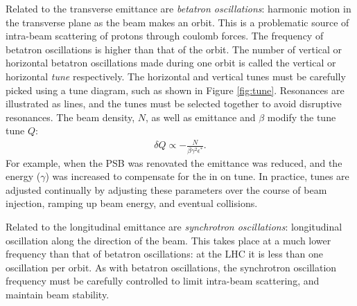 Related to the transverse emittance are \emph{betatron oscillations}: harmonic motion in the transverse plane as the beam makes an orbit.\cite{pdgAccelSection}
This is a problematic source of intra-beam scattering of protons through coulomb forces.
The frequency of betatron oscillations is higher than that of the orbit.
The number of vertical or horizontal betatron oscillations made during one orbit is called the vertical or horizontal \emph{tune} respectively.
The horizontal and vertical tunes must be carefully picked using a tune diagram, such as shown in Figure \ref{fig:tune}.
Resonances are illustrated as lines, and the tunes must be selected together to avoid disruptive resonances.
The beam density, $N$, as well as emittance and $\beta$ modify the tune tune $Q$:
\begin{equation}\begin{split}
    \delta Q\propto-\frac{N}{\beta\gamma^2\epsilon^*}.
\end{split}\end{equation} 
For example, when the PSB was renovated the emittance was reduced, and the energy ($\gamma$) was increased to compensate for the in on tune.
In practice, tunes are adjusted continually by adjusting these parameters over the course of beam injection, ramping up beam energy, and eventual collisions.

Related to the longitudinal emittance are \emph{synchrotron oscillations}: longitudinal oscillation along the direction of the beam.
This takes place at a much lower frequency than that of betatron oscillations: at the LHC it is less than one oscillation per orbit.
As with betatron oscillations, the synchrotron oscillation frequency must be carefully controlled to limit intra-beam scattering, and maintain beam stability.\cite{pdgAccelSection}

